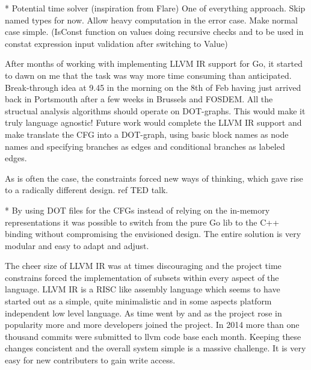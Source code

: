 %
%
%
%
%
%




* Potential time solver (inspiration from Flare)
One of everything approach. Skip named types for now. Allow heavy computation in the error case. Make normal case simple. (IsConst function on values doing recursive checks and to be used in constat expression input validation after switching to Value)


After months of working with implementing LLVM IR support for Go, it started to dawn on me that the task was way more time consuming than anticipated. Break-through idea at 9.45 in the morning on the 8th of Feb having just arrived back in Portsmouth after a few weeks in Brussels and FOSDEM. All the structual analysis algorithms should operate on DOT-graphs. This would make it truly language agnostic! Future work would complete the LLVM IR support and make translate the CFG into a DOT-graph, using basic block names as node names and specifying branches as edges and conditional branches as labeled edges.

As is often the case, the constraints forced new ways of thinking, which gave rise to a radically different design. ref TED talk.

* By using DOT files for the CFGs instead of relying on the in-memory representations it was possible to switch from the pure Go lib to the C++ binding without compromising the envisioned design. The entire solution is very modular and easy to adapt and adjust.


The cheer size of LLVM IR was at times discouraging and the project time constrains forced the implementation of subsets within every aspect of the language. LLVM IR is a RISC like assembly language which seems to have started out as a simple, quite minimalistic and in some aspects platform independent low level language. As time went by and as the project rose in popularity more and more developers joined the project. In 2014 more than one thousand commits were submitted to llvm code base each month. Keeping these changes concistent and the overall system simple is a massive challenge. It is very easy for new contributers to gain write access.

